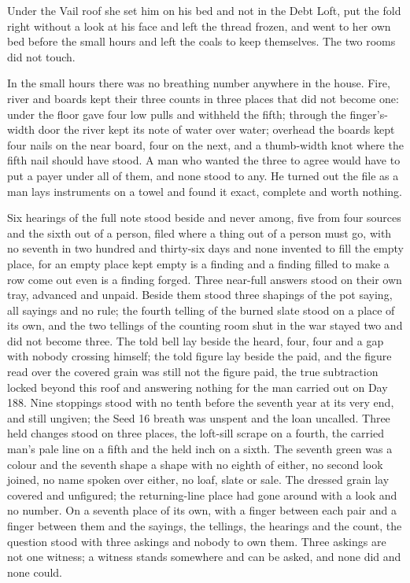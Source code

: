 Under the Vail roof she set him on his bed and not in the Debt Loft, put the fold right without a look at his face and left the thread frozen, and went to her own bed before the small hours and left the coals to keep themselves. The two rooms did not touch.

In the small hours there was no breathing number anywhere in the house. Fire, river and boards kept their three counts in three places that did not become one: under the floor  gave four low pulls and withheld the fifth; through the finger's-width door the river kept its note of water over water; overhead the boards kept four nails on the near board, four on the next, and a thumb-width knot where the fifth nail should have stood. A man who wanted the three to agree would have to put a payer under all of them, and none stood to any. He turned out the file as a man lays instruments on a towel and found it exact, complete and worth nothing.

Six hearings of the full note stood beside and never among, five from four sources and the sixth out of a person, filed where a thing out of a person must go, with no seventh in two hundred and thirty-six days and none invented to fill the empty place, for an empty place kept empty is a finding and a finding filled to make a row come out even is a finding forged. Three near-full answers stood on their own tray, advanced and unpaid. Beside them stood three shapings of the pot saying, all sayings and no rule; the fourth telling of the burned slate stood on a place of its own, and the two tellings of the counting room shut in the war stayed two and did not become three. The told bell lay beside the heard, four, four and a gap with nobody crossing himself; the told figure lay beside the paid, and the figure read over the covered grain was still not the figure paid, the true subtraction locked beyond this roof and answering nothing for the man carried out on Day 188. Nine stoppings stood with no tenth before the seventh year at its very end, and still ungiven; the Seed 16 breath was unspent and the loan uncalled. Three held changes stood on three places, the loft-sill scrape on a fourth, the carried man's pale line on a fifth and the held inch on a sixth. The seventh green was a colour and the seventh shape a shape with no eighth of either, no second look joined, no name spoken over either, no loaf, slate or sale. The dressed grain lay covered and unfigured; the returning-line place had gone around with a look and no number. On a seventh place of its own, with a finger between each pair and a finger between them and the sayings, the tellings, the hearings and the count, the question stood with three askings and nobody to own them. Three askings are not one witness; a witness stands somewhere and can be asked, and none did and none could.

